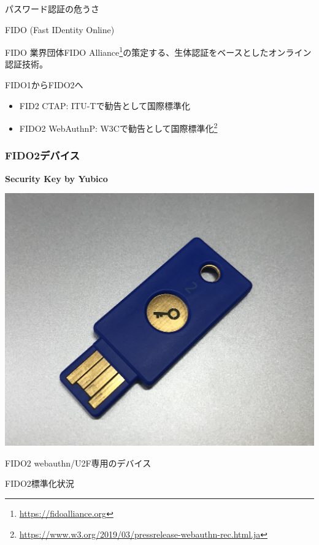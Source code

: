 \documentclass[12pt,dvipdfmx,uplatex]{beamer}
\begin{document}
\begin{frame}{パスワード認証の危うさ}
 
\end{frame}

\begin{frame}{FIDO (Fast IDentity Online)}

\begin{block}{\small FIDO}
業界団体FIDO Alliance\footnote[frame]{\scriptsize \url{https://fidoalliance.org}}の策定する、生体認証をベースとしたオンライン認証技術。
\end{block}

\end{frame}

\begin{frame}{FIDO1からFIDO2へ}

\begin{itemize}
 \item FID2 CTAP: ITU-Tで勧告として国際標準化
 \item \alert{FIDO2 WebAuthn}P: W3Cで勧告として国際標準化\footnote[frame]{\scriptsize \url{https://www.w3.org/2019/03/pressrelease-webauthn-rec.html.ja}}
\end{itemize}
 
\end{frame}


\begin{frame}
\frametitle{FIDO2デバイス}
\textbf{Security Key by Yubico}
\begin{center}
\includegraphics[width=0.6\linewidth]{Figs/security-key-by-yubico.png}
\end{center}
FIDO2 webauthn/U2F専用のデバイス
\end{frame}


\begin{frame}{FIDO2標準化状況}
 
\end{frame}





 

\end{document}
